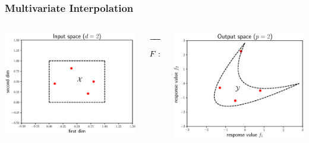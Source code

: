 \documentclass[aspectratio=169]{beamer}
\begin{document}
\begin{frame}\frametitle{Multivariate Interpolation}
\begin{columns}
\begin{column}{.35\textwidth}
\includegraphics[width=\textwidth]{feasible_design_with_data.eps}
\end{column}
\begin{column}{.2\textwidth}
\begin{center}
$\xrightarrow{\hspace*{2cm}}$
$$
F : {\cal X} \rightarrow {\cal Y}
$$
\end{center}
\end{column}
\begin{column}{.35\textwidth}
\includegraphics[width=\textwidth]{convex_pareto_with_data.eps}
\end{column}
\end{columns}


\end{frame}
\end{document}
